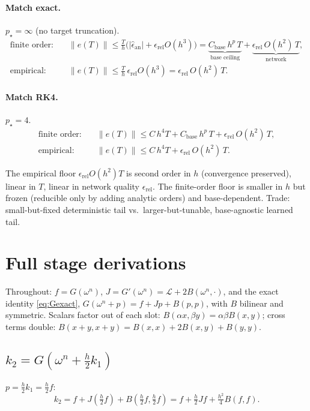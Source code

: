 \documentclass[11pt]{article}
\newcommand{\Lop}{\mathcal{L}}
\begin{document}
\paragraph{Match exact.} $p_\star=\infty$ (no target truncation).
\begin{align}
  \text{finite order:}\quad
  &\|e(T)\|\le \tfrac{T}{h}\big(|\hat\epsilon_{\mathrm{an}}|+\epsilon_{\mathrm{rel}}O(h^3)\big)
   = \underbrace{C_{\mathrm{base}}\,h^{p}\,T}_{\text{base ceiling}}
   +\underbrace{\epsilon_{\mathrm{rel}}\,O(h^2)\,T}_{\text{network}},\\
  \text{empirical:}\quad
  &\|e(T)\|\le \tfrac{T}{h}\,\epsilon_{\mathrm{rel}}O(h^3)
   = \epsilon_{\mathrm{rel}}\,O(h^2)\,T .
\end{align}

\paragraph{Match RK4.} $p_\star=4$.
\begin{align}
  \text{finite order:}\quad
  &\|e(T)\|\le C\,h^{4}T+C_{\mathrm{base}}\,h^{p}\,T+\epsilon_{\mathrm{rel}}\,O(h^2)\,T,\\
  \text{empirical:}\quad
  &\|e(T)\|\le C\,h^{4}T+\epsilon_{\mathrm{rel}}\,O(h^2)\,T .
\end{align}

\begin{remark}
The empirical floor $\epsilon_{\mathrm{rel}}O(h^2)T$ is second order in $h$
(convergence preserved), linear in $T$, linear in network quality
$\epsilon_{\mathrm{rel}}$. The finite-order floor is smaller in $h$ but frozen
(reducible only by adding analytic orders) and base-dependent. Trade:
small-but-fixed deterministic tail vs.\ larger-but-tunable, base-agnostic
learned tail.
\end{remark}

\appendix
\section{Full stage derivations}\label{app:stages}
Throughout: $f=G(\omega^n)$, $J=G'(\omega^n)=\Lop+2B(\omega^n,\cdot)$, and the exact identity
\eqref{eq:Gexact}, $G(\omega^n+p)=f+Jp+B(p,p)$, with $B$ bilinear and symmetric. Scalars factor
out of each slot: $B(\alpha x,\beta y)=\alpha\beta B(x,y)$; cross terms double: $B(x+y,x+y)=B(x,x)+2B(x,y)+B(y,y)$.

\subsection{$k_2=G(\omega^n+\tfrac h2 k_1)$}
$p=\tfrac h2 k_1=\tfrac h2 f$:
\begin{equation}
  k_2 = f + J\!\left(\tfrac h2 f\right) + B\!\left(\tfrac h2 f,\tfrac h2 f\right)
      = f + \tfrac h2 Jf + \tfrac{h^2}{4}B(f,f).
\end{equation}
\end{document}
